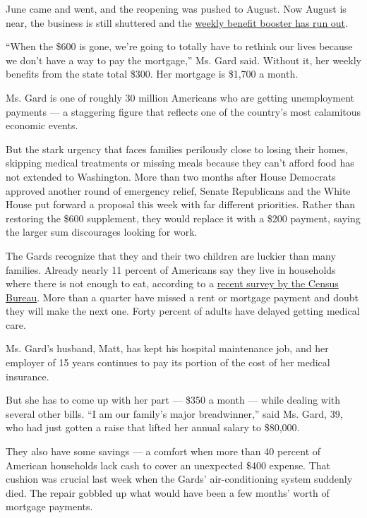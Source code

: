 June came and went, and the reopening was pushed to August. Now August
is near, the business is still shuttered and the
\href{https://www.nytimes3xbfgragh.onion/2020/07/21/business/economy/coronavirus-unemployment-benefits.html}{weekly
benefit booster has run out}.

``When the \$600 is gone, we're going to totally have to rethink our
lives because we don't have a way to pay the mortgage,'' Ms. Gard said.
Without it, her weekly benefits from the state total \$300. Her mortgage
is \$1,700 a month.

Ms. Gard is one of roughly 30 million Americans who are getting
unemployment payments --- a staggering figure that reflects one of the
country's most calamitous economic events.

But the stark urgency that faces families perilously close to losing
their homes, skipping medical treatments or missing meals because they
can't afford food has not extended to Washington. More than two months
after House Democrats approved another round of emergency relief, Senate
Republicans and the White House put forward a proposal this week with
far different priorities. Rather than restoring the \$600 supplement,
they would replace it with a \$200 payment, saying the larger sum
discourages looking for work.

The Gards recognize that they and their two children are luckier than
many families. Already nearly 11 percent of Americans say they live in
households where there is not enough to eat, according to a
\href{https://www.census.gov/programs-surveys/household-pulse-survey/data.html?utm_campaign=20200727mspuls1ccdtanl\&utm_medium=email\&utm_source=govdelivery}{recent
survey by the Census Bureau}. More than a quarter have missed a rent or
mortgage payment and doubt they will make the next one. Forty percent of
adults have delayed getting medical care.

Ms. Gard's husband, Matt, has kept his hospital maintenance job, and her
employer of 15 years continues to pay its portion of the cost of her
medical insurance.

But she has to come up with her part --- \$350 a month --- while dealing
with several other bills. ``I am our family's major breadwinner,'' said
Ms. Gard, 39, who had just gotten a raise that lifted her annual salary
to \$80,000.

They also have some savings --- a comfort when more than 40 percent of
American households lack cash to cover an unexpected \$400 expense. That
cushion was crucial last week when the Gards' air-conditioning system
suddenly died. The repair gobbled up what would have been a few months'
worth of mortgage payments.

